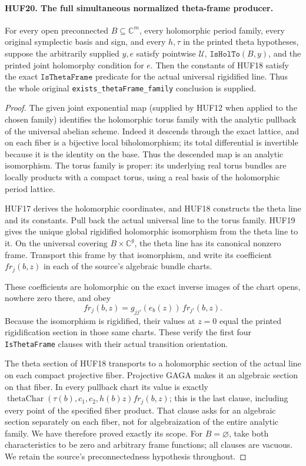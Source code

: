 \paragraph{HUF20. The full simultaneous normalized theta-frame producer.}
\label{claim:HUF20}
For every open preconnected \(B\subseteq\mathbb C^m\),
every holomorphic period family, every original
symplectic basis and sign, and every \(h,\tau\)
in the printed theta hypotheses, suppose the
arbitrarily supplied \(y,e\) satisfy pointwise
\(\mathcal U\), \(\texttt{IsHolTo}(B,y)\), and
the printed joint holomorphy condition for \(e\).
Then the constants
of HUF18 satisfy the exact
\(\texttt{IsThetaFrame}\) predicate for the
actual universal rigidified line.
Thus the whole original
\texttt{exists\_thetaFrame\_family} conclusion
is supplied.

\begin{proof}
The given joint exponential map (supplied by HUF12
when applied to the chosen family) identifies the holomorphic
torus family with the analytic pullback of
the universal abelian scheme.  Indeed it
descends through the exact lattice, and
on each fiber is a bijective local
biholomorphism; its total differential is
invertible because it is the identity on
the base.  Thus the descended map is an
analytic isomorphism.  The torus family is
proper: its underlying real torus bundles
are locally products with a compact torus,
using a real basis of the holomorphic
period lattice.

HUF17 derives the holomorphic coordinates,
and HUF18 constructs the theta line and
its constants.  Pull back the actual
universal line to the torus family.
HUF19 gives the unique global rigidified
holomorphic isomorphism from the theta
line to it.  On the universal covering
\(B\times\mathbb C^g\), the theta line
has its canonical nonzero frame.
Transport this frame by that isomorphism,
and write its coefficient \(fr_j(b,z)\)
in each of the source's algebraic bundle
charts.

These coefficients are holomorphic on
the exact inverse images of the chart
opens, nowhere zero there, and obey
\[
 fr_j(b,z)=g_{jj'}(e_b(z))\,fr_{j'}(b,z).
 \tag{HUF.16}
\]
Because the isomorphism is rigidified,
their values at \(z=0\) equal the
printed rigidification section in
those same charts.  These verify
the first four \texttt{IsThetaFrame}
clauses with their actual transition
orientation.

The theta section of HUF18 transports
to a holomorphic section of the actual
line on each compact projective fiber.
Projective GAGA makes it an algebraic
section on that fiber.  In every
pullback chart its value is exactly
\(\operatorname{thetaChar}(\tau(b),c_1,c_2,h(b)z)
fr_j(b,z)\); this is the last clause,
including every point of the specified
fiber product.  That clause asks for
an algebraic section separately on
each fiber, not for algebraization
of the entire analytic family.
We have therefore proved exactly its
scope.  For \(B=\varnothing\), take
both characteristics to be zero and
arbitrary frame functions; all clauses
are vacuous.  We retain the source's
preconnectedness hypothesis throughout.
\end{proof}

